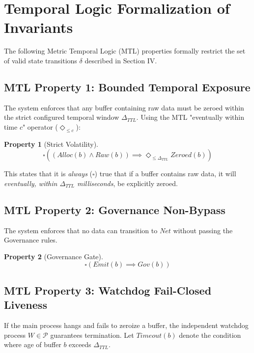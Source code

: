 \documentclass[conference]{IEEEtran}
\newtheorem{property}{Property}
\begin{document}
\appendices

\section{Temporal Logic Formalization of Invariants}
The following Metric Temporal Logic (MTL) properties formally restrict the set of valid state transitions $\delta$ described in Section IV. 

\subsection{MTL Property 1: Bounded Temporal Exposure}
The system enforces that any buffer containing raw data must be zeroed within the strict configured temporal window $\Delta_{TTL}$. Using the MTL "eventually within time $c$" operator ($\Diamond_{\le c}$):

\begin{property}[Strict Volatility]
\begin{equation}
\square \left( (Alloc(b) \land Raw(b)) \implies \Diamond_{\le \Delta_{TTL}} Zeroed(b) \right)
\end{equation}
\end{property}
This states that it is \textit{always} ($\square$) true that if a buffer contains raw data, it will \textit{eventually, within $\Delta_{TTL}$ milliseconds}, be explicitly zeroed.

\subsection{MTL Property 2: Governance Non-Bypass}
The system enforces that no data can transition to $Net$ without passing the Governance rules.

\begin{property}[Governance Gate]
\begin{equation}
\square \left( Emit(b) \implies Gov(b) \right)
\end{equation}
\end{property}

\subsection{MTL Property 3: Watchdog Fail-Closed Liveness}
If the main process hangs and fails to zeroize a buffer, the independent watchdog process $W \in \mathcal{P}$ guarantees termination. Let $Timeout(b)$ denote the condition where age of buffer $b$ exceeds $\Delta_{TTL}$.
\end{document}
